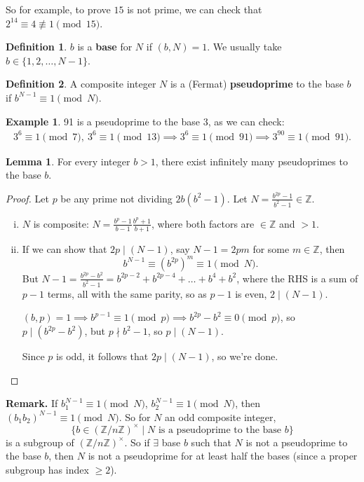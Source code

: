 \documentclass{article}
\theoremstyle{definition}
\newtheorem{lemma}[theorem]{Lemma}
\newtheorem{example}{Example}[section]
\newtheorem{defn}{Definition}[section]
\begin{document}
So for example, to prove $15$ is not prime, we can check that $2^{14}\equiv 4 \not\equiv 1 \pmod{15}$.
\begin{defn}
    $b$ is a \textbf{base} for $N$ if $(b,N)=1$. We usually take ${b \in \{1,2,\ldots,N-1\}}$.
\end{defn}
\begin{defn}
    A composite integer $N$ is a (Fermat) \textbf{pseudoprime}  to the base $b$ if $b^{N-1} \equiv 1\pmod{N}$.
\end{defn}
\begin{example}
    91 is a pseudoprime to the base $3$, as we can check:
    \begin{align*}
        3^6 \equiv 1 \pmod{7},~ 3^6 \equiv 1 \pmod{13} \implies 3^6 \equiv 1 \pmod{91} \implies 3^{90} \equiv 1 \pmod{91}.
    \end{align*}
\end{example}
\begin{lemma}
    For every integer $b>1$, there exist infinitely many pseudoprimes to the base $b$.
\end{lemma}
\begin{proof}
    Let $p$ be any prime not dividing $2b(b^2-1)$. Let $N=\frac{b^{2p}-1}{b^2-1} \in \mathbb{Z}$.
    \begin{enumerate}[(i)]
        \item $N$ is composite: $N = \frac{b^p-1}{b-1}\frac{b^p+1}{b+1}$, where both factors are $\in \mathbb{Z}$ and $>1$.
        \item If we can show that $2p \mid (N-1)$, say $N-1=2pm$ for some $m \in\mathbb{Z}$, then \[
        b^{N-1} \equiv (b^{2p})^m \equiv 1 \pmod{N}.
        \]
        But $N-1 = \frac{b^{2p}-b^2}{b^2-1}=b^{2p-2}+b^{2p-4}+\ldots+b^4+b^2$, where the RHS is a sum of $p-1$ terms, all with the same parity, so as $p-1$ is even, $2 \mid (N-1)$.
        \vspace{1mm}
        
        $(b,p)=1 \implies b^{p-1} \equiv 1\pmod{p} \implies b^{2p} -b^2 \equiv 0 \pmod{p}$, so $p \mid (b^{2p}-b^2)$, but $p \nmid b^2-1$, so $p \mid (N-1)$.
        \vspace{1mm}
        
        Since $p$ is odd, it follows that $2p \mid (N-1)$, so we're done.
    \end{enumerate}
\end{proof}
\textbf{Remark.} If $b_1^{N-1} \equiv 1\pmod{N}$, $b_2^{N-1} \equiv 1 \pmod{N}$, then $(b_1b_2)^{N-1} \equiv 1\pmod{N}$. So for $N$ an odd composite integer, $$\{b \in (\mathbb{Z}/n\mathbb{Z})^\times \mid N \text{ is a pseudoprime to the base }b\}$$ is a subgroup of $(\mathbb{Z}/n\mathbb{Z})^\times$. So if $\exists $ base $b$ such that $N$ is not a pseudoprime to the base $b$, then $N$ is not a pseudoprime for at least half the bases (since a proper subgroup has index $\ge 2$).
\end{document}
